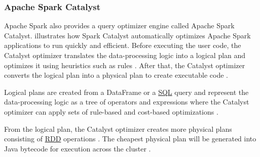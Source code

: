 \subsubsection{Apache Spark Catalyst}
\label{subsubsec:04_spark_pr-model_catalyst}
Apache Spark also provides a query optimizer engine called Apache Spark Catalyst.  illustrates how Spark Catalyst automatically optimizes Apache Spark applications to run quickly and efficient.
Before executing the user code, the Catalyst optimizer translates the data-processing logic into a logical plan and optimizes it using heuristics such as rules \cite{Hien2018Spark}. After that, the Catalyst optimizer converts the logical plan into a physical plan to create executable code \cite{Hien2018Spark}.


Logical plans are created from a DataFrame or a \hyperlink{abbr:sql}{SQL} query and represent the data-processing logic as a tree of operators and expressions where the Catalyst optimizer can apply sets of rule-based and cost-based optimizations \cite{Hien2018Spark}.

From the logical plan, the Catalyst optimizer creates more physical plans consisting of \hyperlink{abbr:rdd}{RDD} operations \cite{Chambers2018Spark}. The cheapest physical plan will be generated into Java bytecode for execution across the cluster \cite{Hien2018Spark}.

